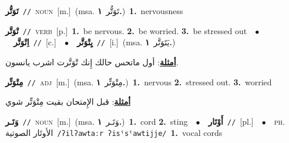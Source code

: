 \documentclass[10pt,a4paper,twoside]{article} %
\begin{document}
\begin{multicols}{2}
{\setlength\topsep{0pt}\textbf{\foreignlanguage{arabic}{تَوَتُّر}}\ {\color{gray}\texttt{//}\color{black}}\ \textsc{noun}\ [m.]\ \color{gray}(msa. \foreignlanguage{arabic}{تَوَتُّر}~\foreignlanguage{arabic}{\textbf{١.}})\color{black}\ \textbf{1.}~nervousness\ } \vspace{2mm}

{\setlength\topsep{0pt}\textbf{\foreignlanguage{arabic}{تْوَتَّر}}\ {\color{gray}\texttt{//}\color{black}}\ \textsc{verb}\ [p.]\ \textbf{1.}~be nervous.  \textbf{2.}~be worried.  \textbf{3.}~be stressed out\ \ $\bullet$\ \ \setlength\topsep{0pt}\textbf{\foreignlanguage{arabic}{اِتْوَتَّر}}\ {\color{gray}\texttt{//}\color{black}}\ [c.]\ \ $\bullet$\ \ \setlength\topsep{0pt}\textbf{\foreignlanguage{arabic}{يِتْوَتَّر}}\ {\color{gray}\texttt{//}\color{black}}\ [i.]\ \color{gray}(msa. \foreignlanguage{arabic}{يَتَوَتَّر}~\foreignlanguage{arabic}{\textbf{١.}})\color{black}\  \begin{flushright}\color{gray}\foreignlanguage{arabic}{\textbf{\underline{\foreignlanguage{arabic}{أمثلة}}}: أول ماتحس حالك إِنك تْوَتَّرت اشرب يانسون.}\end{flushright}\color{black}} \vspace{2mm}

{\setlength\topsep{0pt}\textbf{\foreignlanguage{arabic}{مِتْوَتِّر}}\ {\color{gray}\texttt{//}\color{black}}\ \textsc{adj}\ [m.]\ \color{gray}(msa. \foreignlanguage{arabic}{مِتْوَتِّر}~\foreignlanguage{arabic}{\textbf{١.}})\color{black}\ \textbf{1.}~nervous  \textbf{2.}~stressed out.  \textbf{3.}~worried\  \begin{flushright}\color{gray}\foreignlanguage{arabic}{\textbf{\underline{\foreignlanguage{arabic}{أمثلة}}}: قبل الإِمتحان بقيت مِتْوَتِّر شوي}\end{flushright}\color{black}} \vspace{2mm}

{\setlength\topsep{0pt}\textbf{\foreignlanguage{arabic}{وَتَـر}}\ {\color{gray}\texttt{//}\color{black}}\ \textsc{noun}\ [m.]\ \color{gray}(msa. \foreignlanguage{arabic}{وَتَـر}~\foreignlanguage{arabic}{\textbf{١.}})\color{black}\ \textbf{1.}~cord  \textbf{2.}~sting\ \ $\bullet$\ \ \setlength\topsep{0pt}\textbf{\foreignlanguage{arabic}{أَوْتَار}}\ {\color{gray}\texttt{//}\color{black}}\ [pl.]\ \ $\bullet$\ \ \textsc{ph.} \color{gray} \foreignlanguage{arabic}{الأوتَار الصوتية}\color{black}\ {\color{gray}\texttt{/{\sffamily ʔilʔawtaːr ʔisˤsˤawtijje}/}\color{black}}\ \textbf{1.}~vocal cords\ } \vspace{2mm}


\end{multicols}
\end{document}
